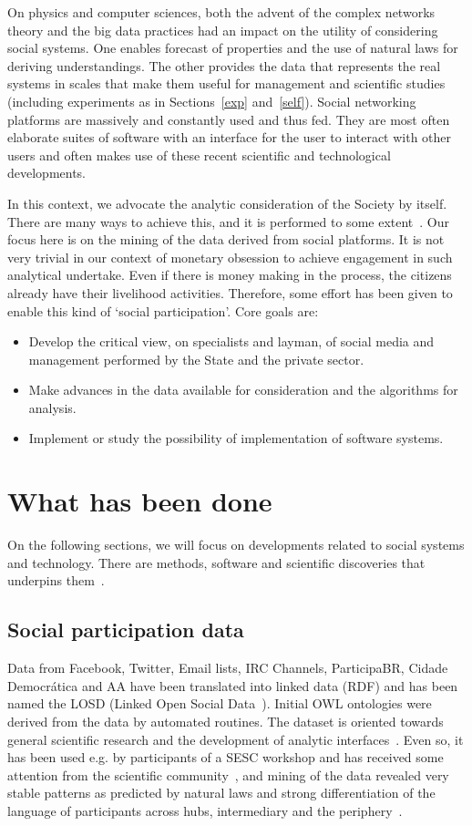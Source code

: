 \documentclass[letterpaper,10pt]{article}
\begin{document}
On physics and computer sciences,
both the advent of the complex networks
theory and the big data practices
had an impact on the utility of considering
social systems.
One enables forecast of properties
and the use of natural laws for deriving understandings.
The other provides the data that represents the real systems
in scales that make them useful for management and
scientific studies (including experiments as in Sections~\ref{exp} and~\ref{self}).
Social networking platforms are massively and constantly used and thus fed.
They are most often elaborate suites of software with
an interface for the user to interact with other users
and often makes use of these recent scientific and technological
developments.\cite{tese}

In this context,
we advocate the analytic consideration
of the Society by itself.
There are many ways to achieve this,
and it is performed to some extent~\cite{scriptLattes,losd,p5,an,an2}.
Our focus here is on the mining of the data
derived from social platforms.
It is not very trivial in our context
of monetary obsession to achieve engagement
in such analytical undertake.
Even if there is money making in the process,
the citizens already have their livelihood activities.
Therefore, some effort has been given to
enable this kind of `social participation'.
Core goals are:
\begin{itemize}
	\item Develop the critical view, on specialists and layman,
		of social media and
		management performed by the State and the private sector.
	\item Make advances in the data available for consideration
		and the algorithms for analysis.
	\item Implement or study the possibility of implementation
		of software systems.
\end{itemize}

\section{What has been done}
On the following sections, we will focus on
developments related to social systems and technology.
There are methods, software and scientific discoveries
that underpins them~\cite{stab,tese,kolm}.

\subsection{Social participation data}\label{losd}
Data from Facebook, Twitter, Email lists, IRC Channels, ParticipaBR,
Cidade Democrática and AA have been translated into linked data (RDF)
and has been named the LOSD (Linked Open Social Data~\cite{losd}).
Initial OWL ontologies were derived from the data by automated routines.
The dataset is oriented towards general scientific research
and the development of analytic interfaces~\cite{p1,p2,p3,p4,p5}.
Even so, it has been used e.g. by participants of a SESC workshop
and has received some attention from the scientific community~\cite{drones,tese},
and mining of the data revealed very stable patterns as predicted by natural laws
and strong differentiation of the language of participants across hubs,
intermediary and the periphery~\cite{stab,tese}. 
\end{document}
